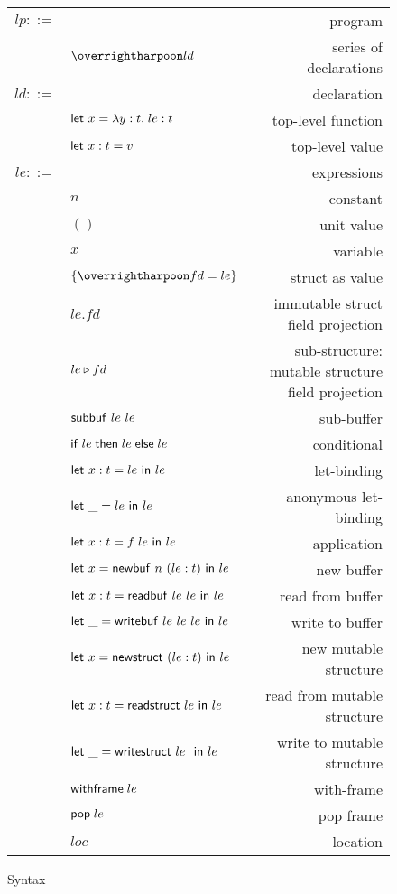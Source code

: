 \begin{figure}[!htbp]
\begin{center}
  \begin{tabularx}{\columnwidth}{rlR}
    $lp ::= $ & & program \\
      & $\ls{ld}$                      & series of declarations \\[1.2mm]

    $ld ::= $ & & declaration \\
      & $\text{\textsf{let}}\ x=\lambda y:t.\;le:t$                & top-level function \\
    & $\text{\textsf{let}}\ x:t=v$               & top-level value \\
    [1.2mm]

    $le ::= $ & & expressions \\
    & $n$    & constant \\
    & $()$ & unit value \\
    & $x$                           & variable \\
    & $\{\ls{fd=le}\}$ & struct as value \\
    & $le.fd$ & immutable struct field projection \\
    & ${le} \triangleright {fd}$           & sub-structure: mutable structure field projection \\
    & $\esubbuf{le}{le}$                & sub-buffer \\
    & $\text{\textsf{if}}\;le\;\text{\textsf{then}}\;le\;\text{\textsf{else}}\;le$            & conditional \\
    & $\text{\textsf{let}}\ x:t=le\ \text{\textsf{in}}\ le$                   & let-binding \\
    & $\text{\textsf{let}}\ \_=le\ \text{\textsf{in}}\ le$                   & anonymous let-binding \\
    & $\text{\textsf{let}}\ x:t=f\;le\ \text{\textsf{in}}\ le$                   & application \\
    & $\text{\textsf{let}}\ x=\text{\textsf{newbuf}}\ n\ (le:t)\ \text{\textsf{in}}\ le$                 & new buffer \\
    & $\text{\textsf{let}}\ x:t=\text{\textsf{readbuf}}\ le\ le\ \text{\textsf{in}}\ le$  & read from buffer \\
    & $\text{\textsf{let}}\ \_=\text{\textsf{writebuf}}\ le\ le\ le\ \text{\textsf{in}}\ le$              & write to buffer \\
    & $\text{\textsf{let}}\ x=\text{\textsf{newstruct}}\ (le:t)\ \text{\textsf{in}}\ le$                 & new mutable structure \\
    & $\text{\textsf{let}}\ x:t=\text{\textsf{readstruct}}\ le\ \text{\textsf{in}}\ le$                & read from mutable structure \\
    & $\text{\textsf{let}}\ \_=\text{\textsf{writestruct}}\ le\ \ \text{\textsf{in}}\ le$               & write to mutable structure \\
    & $\text{\textsf{withframe}}\;le$ & with-frame \\
    & $\text{\textsf{pop}}\;le$ & pop frame \\
    & $loc$                        & location \\
    [1.2mm]

  \end{tabularx}
\end{center}
\caption{\lamstar Syntax}
\label{fig:lowstar-syntax}
\end{figure}

